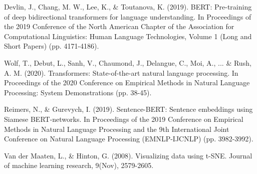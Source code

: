 \documentclass{article}
\begin{document}
\begin{thebibliography}{9}

Devlin, J., Chang, M. W., Lee, K., \& Toutanova, K. (2019). BERT: Pre-training of deep bidirectional transformers for language understanding. In Proceedings of the 2019 Conference of the North American Chapter of the Association for Computational Linguistics: Human Language Technologies, Volume 1 (Long and Short Papers) (pp. 4171-4186).

Wolf, T., Debut, L., Sanh, V., Chaumond, J., Delangue, C., Moi, A., ... \& Rush, A. M. (2020). Transformers: State-of-the-art natural language processing. In Proceedings of the 2020 Conference on Empirical Methods in Natural Language Processing: System Demonstrations (pp. 38-45).

Reimers, N., \& Gurevych, I. (2019). Sentence-BERT: Sentence embeddings using Siamese BERT-networks. In Proceedings of the 2019 Conference on Empirical Methods in Natural Language Processing and the 9th International Joint Conference on Natural Language Processing (EMNLP-IJCNLP) (pp. 3982-3992).

Van der Maaten, L., \& Hinton, G. (2008). Visualizing data using t-SNE. Journal of machine learning research, 9(Nov), 2579-2605.

\end{thebibliography}
\end{document}
